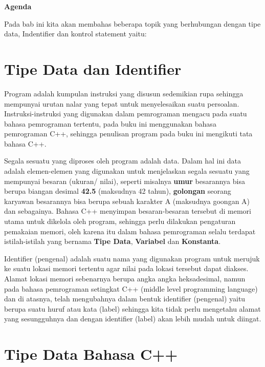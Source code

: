 \textbf{Agenda}

Pada bab ini kita akan membahas beberapa topik yang berhubungan dengan tipe data, Indentifier dan kontrol statement yaitu:

\minitoc

\section{Tipe Data dan Identifier}\label{tipe-data-dan-identifier}

Program adalah kumpulan instruksi yang disusun sedemikian rupa sehingga
mempunyai urutan nalar yang tepat untuk menyelesaikan suatu persoalan.
Instruksi-instruksi yang digunakan dalam pemrograman mengacu pada suatu
bahasa pemrograman tertentu, pada buku ini menggunakan bahasa
pemrograman C++, sehingga penulisan program pada buku ini mengikuti tata
bahasa C++.

Segala sesuatu yang diproses oleh program adalah data. Dalam hal ini
data adalah elemen-elemen yang digunakan untuk menjelaskan segala
sesuatu yang mempunyai besaran (ukuran/ nilai), seperti misalnya
\textbf{umur} besarannya bisa berupa biangan desimal \textbf{42.5}
(maksudnya 42\textonehalf{} tahun), \textbf{golongan} seorang karyawan besarannya
bisa berupa sebuah karakter A (maksudnya goongan A) dan sebagainya.
Bahasa C++ menyimpan besaran-besaran tersebut di memori utama untuk
dikelola oleh program, sehingga perlu dilakukan pengaturan pemakaian
memori, oleh karena itu dalam bahasa pemrograman selalu terdapat
istilah-istilah yang bernama \textbf{Tipe Data}, \textbf{Variabel} dan
\textbf{Konstanta}.

Identifier (pengenal) adalah suatu nama yang digunakan program untuk
merujuk ke suatu lokasi memori tertentu agar nilai pada lokasi tersebut
dapat diakses. Alamat lokasi memori sebenarnya berupa angka angka
heksadesimal, namun pada bahasa pemrograman
setingkat C++ (middle level programming language)
 dan di atasnya, telah
mengubahnya dalam bentuk identifier (pengenal) yaitu berupa suatu huruf
atau kata (label) sehingga kita tidak perlu mengetahu alamat yang
sesungguhnya dan dengan identifier (label) akan lebih mudah untuk
diingat.

\section{Tipe Data Bahasa C++}\label{tipe-data-bahasa-c}

